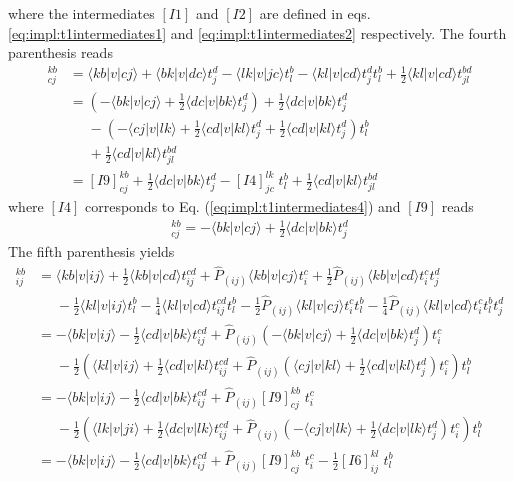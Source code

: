 where the intermediates $[I1]$ and $[I2]$ are defined in eqs. \ref{eq:impl:t1intermediates1} and \ref{eq:impl:t1intermediates2} respectively. The fourth parenthesis reads
\begin{align}
[I8]_{cj}^{kb} &=\langle kb|v|cj\rangle + \langle bk|v|dc\rangle t_j^d-\langle lk|v|jc\rangle t_l^b-\langle kl|v|cd\rangle t_j^dt_l^b+\frac{1}{2}\langle kl|v|cd\rangle t_{jl}^{bd}\nonumber\\
&=\left(-\langle bk|v|cj\rangle + \frac{1}{2}\langle dc|v|bk\rangle t_j^d\right)+\frac{1}{2}\langle dc|v|bk\rangle t_j^d\nonumber\\
&\phantom{=}-\left(-\langle cj|v|lk\rangle+\frac{1}{2}\langle cd|v|kl\rangle t_j^d+\frac{1}{2}\langle cd|v|kl\rangle t_j^d\right)t_l^b\nonumber\\
&\phantom{=}+\frac{1}{2}\langle cd|v|kl\rangle t_{jl}^{bd}\nonumber\\
&=[I9]_{cj}^{kb}+\frac{1}{2}\langle dc|v|bk\rangle t_j^d-[I4]_{jc}^{lk}\phantom{.}t_l^b+\frac{1}{2}\langle cd|v|kl\rangle t_{jl}^{bd}
\label{eq:impl:t2intermediates8}
\end{align}
where $[I4]$ corresponds to Eq. (\ref{eq:impl:t1intermediates4}) and $[I9]$ reads
\begin{align}
[I9]_{cj}^{kb} = -\langle bk|v|cj\rangle + \frac{1}{2}\langle dc|v|bk\rangle t_j^d
\label{eq:impl:t2intermediates9}
\end{align}
The fifth parenthesis yields
\begin{align}
[I10]_{ij}^{kb}&= \langle kb|v|ij\rangle +\frac{1}{2}\langle kb|v|cd\rangle t_{ij}^{cd}+\hat{P}_{(ij)}\langle kb|v|cj\rangle t_i^c+\frac{1}{2}\hat{P}_{(ij)}\langle kb|v|cd\rangle t_i^ct_j^d\nonumber\\
&\phantom{=}-\frac{1}{2}\langle kl|v|ij\rangle t_l^b-\frac{1}{4}\langle kl|v|cd\rangle t_{ij}^{cd}t_l^b-\frac{1}{2}\hat{P}_{(ij)}\langle kl|v|cj\rangle t_i^ct_l^b-\frac{1}{4}\hat{P}_{(ij)}\langle kl|v|cd\rangle t_i^ct_l^bt_j^d\nonumber\\
&=-\langle bk|v|ij\rangle-\frac{1}{2}\langle cd|v|bk\rangle t_{ij}^{cd}+\hat{P}_{(ij)}\left(-\langle bk|v|cj\rangle+ \frac{1}{2}\langle dc|v|bk\rangle t_j^d \right)t_i^c\nonumber\\
&\phantom{=}-\frac{1}{2}\left(\langle kl|v|ij\rangle+\frac{1}{2}\langle cd|v|kl\rangle t_{ij}^{cd}+\hat{P}_{(ij)}\left(\langle cj|v|kl\rangle+ \frac{1}{2}\langle cd|v|kl\rangle t_j^d\right)t_i^c\right)t_l^b\nonumber\\
&=-\langle bk|v|ij\rangle-\frac{1}{2}\langle cd|v|bk\rangle t_{ij}^{cd}+\hat{P}_{(ij)}[I9]_{cj}^{kb}\phantom{.}t_i^c\nonumber\\
&\phantom{=}-\frac{1}{2}\left(\langle lk|v|ji\rangle+\frac{1}{2}\langle dc|v|lk\rangle t_{ij}^{cd}+\hat{P}_{(ij)}\left(-\langle cj|v|lk\rangle+ \frac{1}{2}\langle dc|v|lk\rangle t_j^d\right)t_i^c\right)t_l^b\nonumber\\
&=-\langle bk|v|ij\rangle-\frac{1}{2}\langle cd|v|bk\rangle t_{ij}^{cd}+\hat{P}_{(ij)}[I9]_{cj}^{kb}\phantom{.}t_i^c-\frac{1}{2} [I6]_{ij}^{kl}\phantom{.}t_l^b
\label{eq:impl:t2intermediates10}
\end{align}
